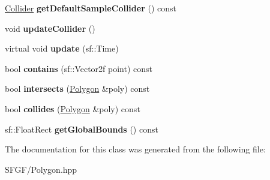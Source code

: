 \begin{DoxyCompactItemize}
\item 
\hyperlink{classsfgf_1_1Collider}{Collider} {\bfseries get\+Default\+Sample\+Collider} () const \hypertarget{classsfgf_1_1Polygon_a4c414f102f071f4bb249660998bbef85}{}\label{classsfgf_1_1Polygon_a4c414f102f071f4bb249660998bbef85}

\item 
void {\bfseries update\+Collider} ()\hypertarget{classsfgf_1_1Polygon_a46e0ea175d0cde1b1ef252299c83c58b}{}\label{classsfgf_1_1Polygon_a46e0ea175d0cde1b1ef252299c83c58b}

\item 
virtual void {\bfseries update} (sf\+::\+Time)\hypertarget{classsfgf_1_1Polygon_a175546b9b45787e783684d28f0281eea}{}\label{classsfgf_1_1Polygon_a175546b9b45787e783684d28f0281eea}

\item 
bool {\bfseries contains} (sf\+::\+Vector2f point) const \hypertarget{classsfgf_1_1Polygon_a6f02e5633538e728a35e27346517e6e1}{}\label{classsfgf_1_1Polygon_a6f02e5633538e728a35e27346517e6e1}

\item 
bool {\bfseries intersects} (\hyperlink{classsfgf_1_1Polygon}{Polygon} \&poly) const \hypertarget{classsfgf_1_1Polygon_ade7f35a67281ac16b89db0e9291a9953}{}\label{classsfgf_1_1Polygon_ade7f35a67281ac16b89db0e9291a9953}

\item 
bool {\bfseries collides} (\hyperlink{classsfgf_1_1Polygon}{Polygon} \&poly) const \hypertarget{classsfgf_1_1Polygon_adb1b2f7577c70c89c671b569a57a13ca}{}\label{classsfgf_1_1Polygon_adb1b2f7577c70c89c671b569a57a13ca}

\item 
sf\+::\+Float\+Rect {\bfseries get\+Global\+Bounds} () const \hypertarget{classsfgf_1_1Polygon_a412b42bdff02c0c757993e099b5834af}{}\label{classsfgf_1_1Polygon_a412b42bdff02c0c757993e099b5834af}

\end{DoxyCompactItemize}


The documentation for this class was generated from the following file\+:\begin{DoxyCompactItemize}
\item 
S\+F\+G\+F/Polygon.\+hpp\end{DoxyCompactItemize}
